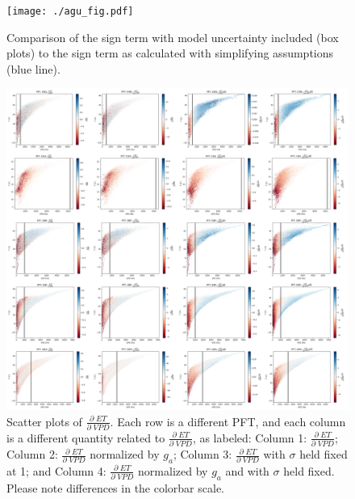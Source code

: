 \documentclass[draft,linenumbers]{agujournal}
\begin{document}
\begin{figure}[h]
\centering
\texttt{[image: ./agu\_fig.pdf]}
\caption{Comparison of the sign term with model uncertainty included (box plots) to the sign term as calculated with simplifying assumptions (blue line).}
\label{agu_fig}
\end{figure}


\begin{figure}[h]
\centering
\centerline{\includegraphics[width=1.4\textwidth]{./fig06.png}}
\caption{Scatter plots of $\frac{\partial \; ET}{\partial \; VPD}$. Each row is a different PFT, and each column is a different quantity related to $\frac{\partial \; ET}{\partial \; VPD}$, as labeled: Column 1: $\frac{\partial \; ET}{\partial \; VPD}$; Column 2: $\frac{\partial \; ET}{\partial \; VPD}$ normalized by $g_a$; Column 3: $\frac{\partial \; ET}{\partial \; VPD}$ with $\sigma$ held fixed at 1; and Column 4: $\frac{\partial \; ET}{\partial \; VPD}$ normalized by $g_a$ and with $\sigma$ held fixed. Please note differences in the colorbar scale.}
\label{real}
\end{figure}

\end{document}
